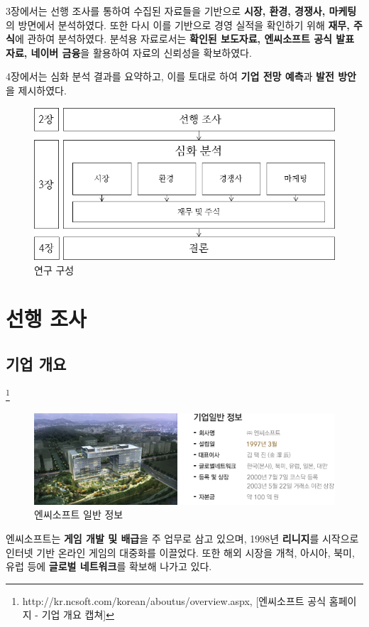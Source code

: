 \documentclass[11pt]{oblivoir}
\begin{document}
			3장에서는 선행 조사를 통하여 수집된 자료들을 기반으로 \textbf{시장, 환경, 경쟁사, 마케팅}의 방면에서 분석하였다. 또한 다시 이를 기반으로 경영 실적을 확인하기 위해 \textbf{재무, 주식}에 관하여 분석하였다. 분석용 자료로서는 \textbf{확인된 보도자료, 엔씨소프트 공식 발표 자료, 네이버 금융}을 활용하여 자료의 신뢰성을 확보하였다.
			
			4장에서는 심화 분석 결과를 요약하고, 이를 토대로 하여 \textbf{기업 전망 예측}과 \textbf{발전 방안}을 제시하였다.
			\begin{figure}[htbp]
				\centering
				\includegraphics[width=1\textwidth]{Methods.png}
				\caption{연구 구성}
			\end{figure}
			
	
	\section{선행 조사}
		\subsection{기업 개요}
		\noindent 
		\footnote{http://kr.ncsoft.com/korean/aboutus/overview.aspx, [엔씨소프트 공식 홈페이지 - 기업 개요 캡쳐]}
		\begin{figure}[htbp]
			\centering
			\includegraphics[width=1\textwidth]{ncinfo.png}
			\caption{엔씨소프트 일반 정보}
		\end{figure} 
		
		엔씨소프트는 \textbf{게임 개발 및 배급}을 주 업무로 삼고 있으며, 1998년 \textbf{리니지}를 시작으로 인터넷 기반 온라인 게임의 대중화를 이끌었다. 또한 해외 시장을 개척, 아시아, 북미, 유럽 등에 \textbf{글로벌 네트워크}를 확보해 나가고 있다.
		
\end{document}

